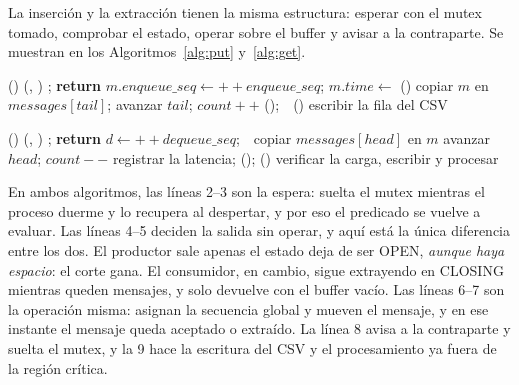 La inserción y la extracción tienen la misma estructura: esperar con el
mutex tomado, comprobar el estado, operar sobre el buffer y avisar a la
contraparte. Se muestran en los Algoritmos~\ref{alg:put} y~\ref{alg:get}.

\begin{algorithm}[H]
\caption{Inserción ()}
\label{alg:put}
\footnotesize
\begin{algorithmic}[1]
\STATE {}()
  \STATE {}(, )
\ENDWHILE
{}
  \STATE {}; \textbf{return}  
\ENDIF
\STATE $m.\mathit{enqueue\_seq} \gets {+}{+}\mathit{enqueue\_seq}$; $m.\mathit{time} \gets$ ()
\STATE copiar $m$ en $\mathit{messages}[\mathit{tail}]$; avanzar $\mathit{tail}$; $\mathit{count}{+}{+}$ 
\STATE {}();\ \ ()
\STATE escribir la fila  del CSV 
\end{algorithmic}
\end{algorithm}

\begin{algorithm}[H]
\caption{Extracción ()}
\label{alg:get}
\footnotesize
\begin{algorithmic}[1]
\STATE {}()
  \STATE {}(, )
\ENDWHILE
{}
  \STATE {}; \textbf{return}  
\ENDIF
\STATE $d \gets {+}{+}\mathit{dequeue\_seq}$;\ \ copiar $\mathit{messages}[\mathit{head}]$ en $m$
\STATE avanzar $\mathit{head}$; $\mathit{count}{-}{-}$ 
\STATE registrar la latencia; (); ()
\STATE verificar la carga, escribir  y procesar 
\end{algorithmic}
\end{algorithm}

En ambos algoritmos, las líneas 2--3 son la espera:  suelta el mutex
mientras el proceso duerme y lo recupera al despertar, y por eso el
predicado se vuelve a evaluar. Las líneas 4--5 deciden la salida sin
operar, y aquí está la única diferencia entre los dos. El productor sale
apenas el estado deja de ser OPEN, \emph{aunque haya espacio}: el corte
gana. El consumidor, en cambio, sigue extrayendo en CLOSING mientras
queden mensajes, y solo devuelve  con el buffer vacío. Las
líneas 6--7 son la operación misma: asignan la secuencia global y mueven
el mensaje, y en ese instante el mensaje queda aceptado o extraído. La
línea 8 avisa a la contraparte y suelta el mutex, y la 9 hace la
escritura del CSV y el procesamiento ya fuera de la región crítica.

